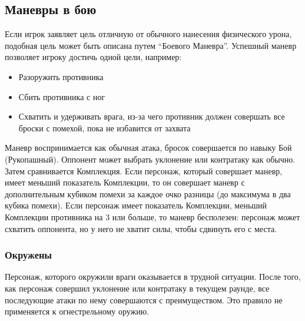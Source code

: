 \documentclass[letterpaper,twocolumn,openany, twoside, 11pt, usenames]{cocbook}
\begin{document}
\subsection*{Маневры в бою}

Если игрок заявляет цель отличную от обычного нанесения физического урона, подобная цель может быть описана путем ``Боевого Маневра''. Успешный маневр позволяет игроку достичь одной цели, например:

\begin{itemize}[leftmargin=4mm]
  \item Разоружить противника
  \item Сбить противника с ног
  \item Схватить и удерживать врага, из-за чего противник должен совершать все броски с помехой, пока не избавится от захвата
\end{itemize}

Маневр воспринимается как обычная атака, бросок совершается по навыку Бой (Рукопашный). Оппонент может выбрать уклонение или контратаку как обычно. Затем сравнивается Комплекция. Если персонаж, который совершает маневр, имеет меньший показатель Комплекции, то он совершает маневр с дополнительным кубиком помехи за каждое очко разницы (до максимума в два кубика помехи). Если персонаж имеет показатель Комплекции, меньший Комплекции противника на 3 или больше, то маневр бесполезен: персонаж может схватить оппонента, но у него не хватит силы, чтобы сдвинуть его с места.

\smallbreak
\noindent {}

\subsubsection*{Окружены}

Персонаж, которого окружили враги оказывается в трудной ситуации. После того, как персонаж совершил уклонение или контратаку в текущем раунде, все последующие атаки по нему совершаются с преимуществом. Это правило не применяется к огнестрельному оружию.
\end{document}
